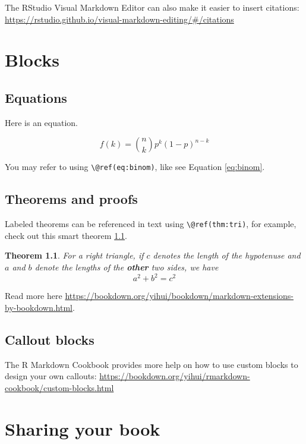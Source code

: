 \documentclass[
]{book}
\newtheorem{theorem}{Theorem}[chapter]
\theoremstyle{definition}
\theoremstyle{definition}
\theoremstyle{definition}
\theoremstyle{definition}
\theoremstyle{remark}
\begin{document}
The RStudio Visual Markdown Editor can also make it easier to insert citations: \url{https://rstudio.github.io/visual-markdown-editing/\#/citations}

\chapter{Blocks}\label{blocks}

\section{Equations}\label{equations}

Here is an equation.

\begin{equation} 
  f\left(k\right) = \binom{n}{k} p^k\left(1-p\right)^{n-k}
  \label{eq:binom}
\end{equation}

You may refer to using \texttt{\textbackslash{}@ref(eq:binom)}, like see Equation \eqref{eq:binom}.

\section{Theorems and proofs}\label{theorems-and-proofs}

Labeled theorems can be referenced in text using \texttt{\textbackslash{}@ref(thm:tri)}, for example, check out this smart theorem \ref{thm:tri}.

\begin{theorem}
\protect\hypertarget{thm:tri}{}\label{thm:tri}For a right triangle, if \(c\) denotes the \emph{length} of the hypotenuse
and \(a\) and \(b\) denote the lengths of the \textbf{other} two sides, we have
\[a^2 + b^2 = c^2\]
\end{theorem}

Read more here \url{https://bookdown.org/yihui/bookdown/markdown-extensions-by-bookdown.html}.

\section{Callout blocks}\label{callout-blocks}

The R Markdown Cookbook provides more help on how to use custom blocks to design your own callouts: \url{https://bookdown.org/yihui/rmarkdown-cookbook/custom-blocks.html}

\chapter{Sharing your book}\label{sharing-your-book}
\end{document}
